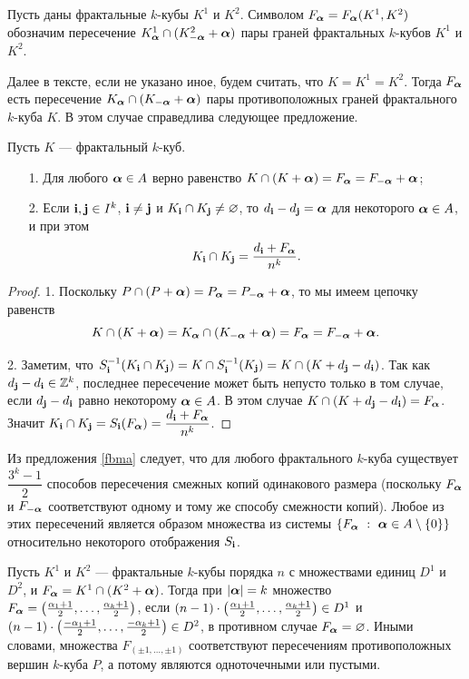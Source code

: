\begin{definition}\label{def:F_alpha}
Пусть даны фрактальные $k$-кубы $K^1$ и $K^2$.
Символом $F_{\bm{\alpha}}=F_{\bm{\alpha}}(K^1,K^2)$ обозначим пересечение $K^1_{\bm{\alpha}}\cap(K^2_{-{\bm{\alpha}}}+{\bm{\alpha}})$ пары граней фрактальных $k$-кубов $K^1$ и $K^2$.
\end{definition}

Далее в тексте, если не указано иное, будем считать, что $K=K^1=K^2$.
Тогда $F_{\bm{\alpha}}$ есть пересечение $K_{\bm{\alpha}}\cap(K_{-{\bm{\alpha}}}+{\bm{\alpha}})$ пары противоположных граней фрактального $k$-куба $K$.
В этом случае справедлива следующее предложение.

\begin{proposition}\label{fbma}
Пусть $K$ --- фрактальный $k$-куб.
\begin{itemize}[nolistsep]
\item[1.] Для любого ${\bm{\alpha}}\in A$ верно равенство $K\cap(K+{\bm{\alpha}})=F_{\bm{\alpha}}=F_{-{\bm{\alpha}}}+{\bm{\alpha}} $;
\item[2.] Если ${\bf{i}},{\bf{j}} \in I^k$, ${\bf{i}}\neq {\bf{j}}$ и $K_{\bf{i}}\cap K_{\bf{j}}\neq\varnothing$, то $d_{\bf{i}}-d_{\bf{j}}={\bm{\alpha}}$ для некоторого ${\bm{\alpha}}\in A$, и при этом 
$$K_{\bf{i}}\cap K_{\bf{j}}=\dfrac{d_{\bf{i}}+F_{\bm{\alpha}}}{n^k}.$$
\end{itemize}
\end{proposition}

\begin{proof}
1. Поскольку $P\cap (P+{\bm{\alpha}})=P_{\bm{\alpha}}=P_{-{\bm{\alpha}}}+{\bm{\alpha}}$, то мы имеем цепочку равенств 
$$K\cap(K+{\bm{\alpha}})= K_{\bm{\alpha}}\cap (K_{-{\bm{\alpha}}}+{\bm{\alpha}})=F_{\bm{\alpha}}=F_{-{\bm{\alpha}}}+{\bm{\alpha}}.$$

2. Заметим, что $S_{\bf{i}}^{-1}(K_{\bf{i}}\cap K_{\bf{j}})=K\cap S_{\bf{i}}^{-1}(K_{\bf{j}})=K\cap (K+d_{\bf{j}}-d_{\bf{i}})$. 
Так как $d_{\bf{j}}-d_{\bf{i}}\in\mathbb{Z}^k$, последнее пересечение может быть непусто только в том случае, если $d_{\bf{j}}-d_{\bf{i}}$ равно некоторому ${\bm{\alpha}}\in A$. 
В этом случае $K\cap(K+d_{\bf{j}}-d_{\bf{i}})=F_{\bm{\alpha}}$.
Значит $K_{\bf{i}}\cap K_{\bf{j}}= S_{\bf{i}}(F_{\bm{\alpha}})= \dfrac{d_{\bf{i}}+F_{\bm{\alpha}}}{n^k}$. 
\end{proof}

Из предложения \ref{fbma} следует, что для любого фрактального $k$-куба существует $\dfrac{3^k-1}{2}$ способов пересечения смежных копий одинакового размера (поскольку $F_{\bm{\alpha}}$ и $F_{-{\bm{\alpha}}}$ соответствуют одному и тому же способу смежности копий). 
Любое из этих пересечений является образом множества из системы $\{F_{\bm{\alpha}}\ :\ {\bm{\alpha}}\in A\setminus\{0\}\}$ относительно некоторого отображения $S_{\bf{i}}$. 

Пусть $K^1$ и $K^2$ --- фрактальные $k$-кубы порядка $n$ с множествами единиц $D^1$ и $D^2$, и $F_{{\bm{\alpha}}}=K^1\cap(K^2+{\bm{\alpha}})$.
Тогда при $|{\bm{\alpha}}|=k$ множество $F_{{\bm{\alpha}}}=\left(\frac{\alpha_1+1}{2},\ldots,\frac{\alpha_k+1}{2}\right)$, если $(n-1)\cdot\left(\frac{\alpha_1+1}{2},\ldots,\frac{\alpha_k+1}{2}\right)\in D^1$ и $(n-1)\cdot\left(\frac{-\alpha_1+1}{2},\ldots,\frac{-\alpha_k+1}{2}\right)\in D^2$, в противном случае $F_{{\bm{\alpha}}}=\varnothing$. 
Иными словами, множества $F_{(\pm1,\ldots,\pm1)}$ соответствуют пересечениям противоположных вершин $k$-куба $P$, а потому являются одноточечными или пустыми.

